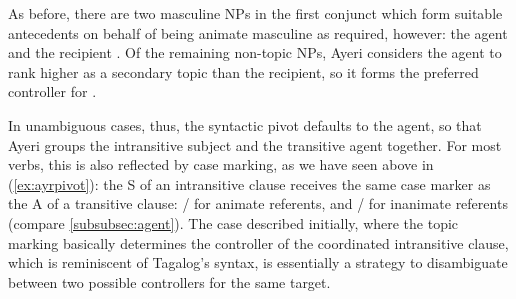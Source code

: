 \begin{morphlex}
\pex
\a {}

\a{}
\xe
\end{morphlex}

As before, there are two masculine NPs in the first conjunct which form
suitable antecedents on behalf of being animate masculine as required, however:
the agent  and the recipient . Of the
remaining non-topic NPs, Ayeri considers the agent to rank higher as a
secondary topic than the recipient, so it forms the preferred controller for
.

In unambiguous cases, thus, the syntactic pivot defaults to the agent, so that
Ayeri groups the intransitive subject and the transitive agent together. For
most verbs, this is also reflected by case marking, as we have seen above in
(\ref{ex:ayrpivot}): the S of an intransitive clause receives the same case
marker as the A of a transitive clause: / for
animate referents, and / for inanimate
referents (compare \autoref{subsubsec:agent}). The case described initially,
where the topic marking basically determines the controller of the coordinated
intransitive clause, which is reminiscent of Tagalog's syntax, is essentially a
strategy to disambiguate between two possible controllers for the same target.

